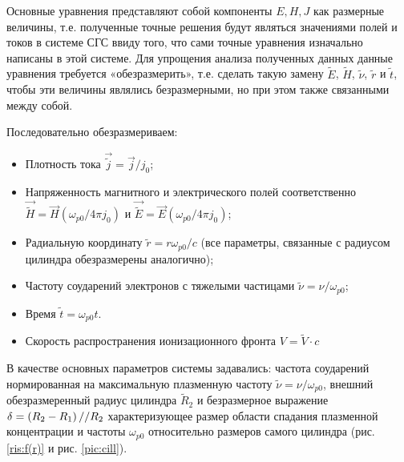 \documentclass[a4paper]{article}
\begin{document}
Основные уравнения представляют собой компоненты $E, H, J$ как размерные величины, т.е. полученные точные решения будут являться значениями полей и токов в системе СГС ввиду того, что сами точные уравнения изначально написаны в этой системе. Для упрощения анализа полученных данных данные уравнения требуется «обезразмерить», т.е. сделать такую замену $\tilde{E}$, $\tilde{H}$, $\tilde{\nu}$, $\tilde{r}$ и $\tilde{t}$, чтобы эти величины являлись безразмерными, но при этом также связанными между собой.

Последовательно обезразмериваем:
\begin{itemize}
	\item Плотность тока $\vec{\widetilde{j}}=\vec{j}/j_{0}$;	
	\item Напряженность магнитного и электрического полей соответственно\\ $\vec{\widetilde{H}}=\vec{H}\left(\omega_{p0}/4\pi j_{0}\right)$ и $\vec{\widetilde{E}}=\vec{E}\left(\omega_{p0}/4\pi j_{0}\right)$;	
	\item Радиальную координату $\widetilde{r}=r\omega_{p0}/c$ (все параметры, связанные с радиусом цилиндра обезразмерены аналогично);	
	\item Частоту соударений электронов с тяжелыми частицами $\widetilde{\nu}=\nu/\omega_{p0}$;	
	\item Время $\tilde{t}=\omega_{p0} t$.	
	\item Скорость распространения ионизационного фронта $V = \tilde{V}\cdot c$
\end{itemize}

В качестве основных параметров системы задавались:  частота соударений нормированная на максимальную плазменную частоту $\tilde{\nu}=\nu/\omega_{p 0}$, внешний обезразмеренный радиус цилиндра $\tilde{R}_{2}$ и безразмерное выражение $\delta=\left(R_{2}-R_{1}\right)/\\/R_{2}$ характеризующее размер области спадания плазменной концентрации и частоты $\omega_{p 0}$ относительно размеров самого цилиндра (рис. \ref{ris:f(r)} и рис. \ref{pic:cill}).
\end{document}
